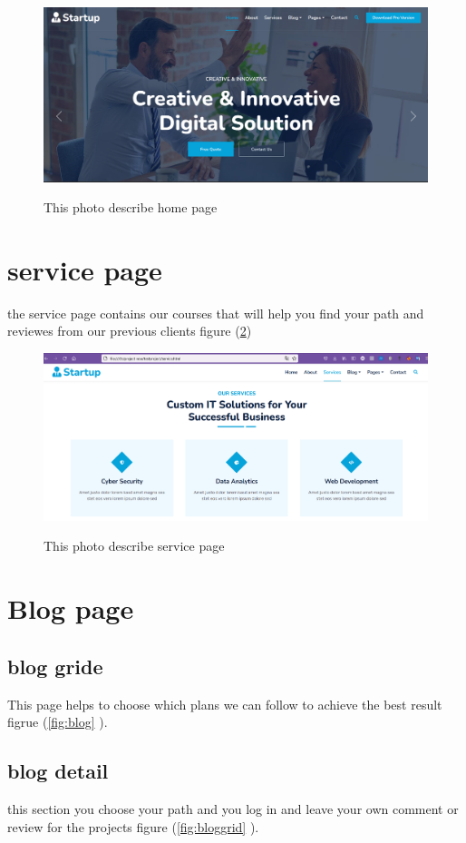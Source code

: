 \documentclass{article}
\begin{document}
\begin{figure}
\centering
\includegraphics[scale=.2]{images/home.png}
\label{fig:home}
\caption{This photo describe home page}
\end{figure}

\section{service page}

the service page contains our courses that will help you find your path and reviewes from our previous clients figure (\ref{fig:service})

\begin{figure}
\centering
\includegraphics[scale=.2]{images/service.png}
\label{fig:service}
\caption{This photo describe service page}
\end{figure}

\section{Blog page}
\subsection{blog gride}
This page helps to choose which plans we can follow to achieve the best result figrue (\ref{fig:blog} ).
\subsection{blog detail}
this section you choose your path and you log in and leave your own comment or review for the projects figure (\ref{fig:bloggrid} ).
\end{document}
